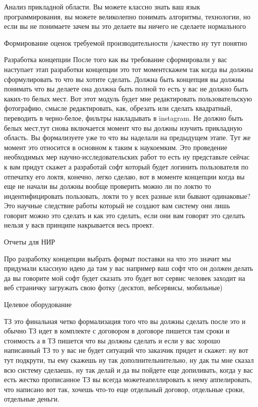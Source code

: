 {Анализ прикладной области.
Вы можете классно знать ваш язык программирования, вы можете великолепно понимать алгоритмы, технологии, но если вы не понимаете зачем вы это делаете вы ничего не сделаете нормального

Формирование оценок требуемой производительности /качество ну тут понятно

Разработка концепции
После того как вы требование сформировали у вас наступает этап разработки концепции это тот моментскажем так когда вы должны сформулировать то что вы хотите сделать.  Должна быть концепция вы должны понимать что вы делаете она должна быть полной то есть у вас не должно быть каких-то белых мест. Вот этот модуль будет мне редактировать пользовательскую фотографию, смысле редактировать, как, обрезать или сделать квадратный, переводить в черно-белое, фильтры накладывать в instagram. Не
должно быть белых мест,тут снова включается момент что вы должны изучить прикладную область. Вы формализуете  уже то что вы наделали на предыдущем этапе. Тут же момент это относится в основном к таким к наукоемким. Это проведение необходимых мер научно-исследовательских работ то есть ну представьте сейчас к вам придут скажет а разработай софт который будет логинить пользователя по  отпечатку его локтя, конечно, легко сделаю, вот в моменте концепции когда вы еще не начали  вы должны вообще проверить можно ли по локтю то индентифицировать пользовать, локти то у всех разные или бывают одинаковые? Это научные следствие работы который не создают вам систему они лишь говорит можно это сделать и как это сделать, если они вам говорят это сделать нельзя у васв принципе накрывается весь проект.

Отчеты для НИР

Про разработку концепции
выбрать формат поставки на что это значит мы придумали классную идею да там у вас например ваш софт что он должен делать да вы говорите мой софт будет сказать это будет вот сервис человек заходит на веб страничку загружать свою фотку (десктоп, вебсервисы, мобильные)

Целевое оборудование

ТЗ это финальная четко формализация того что вы должны сделать после это и обычно ТЗ идет в комплекте с договором в договоре пишется там сроки и стоимость а в ТЗ пишется что вы должны сделать и если у вас хорошо написанный ТЗ то у вас не будет ситуаций что заказчик придет и скажет: ну вот тут подкрути, ты ему скажешь ну так дополнительнительно, ну дак ты мне сказал всю систему сделаешь, ну так делай и да вы пойдете еще допиливать, когда у вас есть жестко прописанное ТЗ вы всегда можетеапеллировать к нему аппелировать, что написано вот так, хочешь что-то еще отдельный договор, отдельные сроки, отдельные деньги.

}
